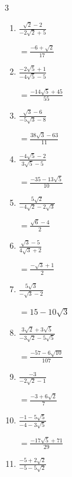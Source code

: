 \begin{multicols}{3}
\begin{enumerate}
        $\displaystyle =\frac{18+15\sqrt{2}}{14}$

  \item $\displaystyle \frac{\sqrt{2}-2}{-2\sqrt{2}+5}$

        $\displaystyle =\frac{-6+\sqrt{2}}{17}$

  \item $\displaystyle \frac{-2\sqrt{5}+1}{-4\sqrt{5}-5}$

        $\displaystyle =\frac{-14\sqrt{5}+45}{55}$

\columnbreak %

  \item $\displaystyle \frac{\sqrt{3}-6}{-5\sqrt{3}-8}$

        $\displaystyle =\frac{38\sqrt{3}-63}{11}$

  \item $\displaystyle \frac{-4\sqrt{5}-2}{3\sqrt{5}-5}$

        $\displaystyle =\frac{-35-13\sqrt{5}}{10}$

  \item $\displaystyle \frac{5\sqrt{2}}{-4\sqrt{2}-2\sqrt{3}}$

        $\displaystyle =\frac{\sqrt{6}-4}{2}$

  \item $\displaystyle \frac{\sqrt{3}-5}{4\sqrt{3}+2}$

        $\displaystyle =\frac{-\sqrt{3}+1}{2}$

  \item $\displaystyle \frac{5\sqrt{3}}{-\sqrt{3}-2}$

        $\displaystyle =15-10\sqrt{3}$

\columnbreak %

  \item $\displaystyle \frac{3\sqrt{2}+3\sqrt{5}}{-3\sqrt{2}-5\sqrt{5}}$

        $\displaystyle =\frac{-57-6\sqrt{10}}{107}$

  \item $\displaystyle \frac{-3}{-2\sqrt{2}-1}$

        $\displaystyle =\frac{-3+6\sqrt{2}}{7}$

  \item $\displaystyle \frac{-1-5\sqrt{5}}{-4-3\sqrt{5}}$

        $\displaystyle =\frac{-17\sqrt{5}+71}{29}$

  \item $\displaystyle \frac{-5+2\sqrt{2}}{-5-5\sqrt{2}}$


\end{enumerate}
\end{multicols}
